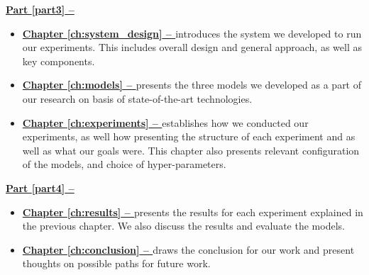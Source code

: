 \vspace{0.5cm}\noindent
\begin{minipage}{\linewidth}
    \textbf{{\hyperref[part3]{Part \ref{part3} -- }}}
    \begin{itemize}
        \item\textbf{\hyperref[ch:system_design]{Chapter \ref{ch:system_design} -- }} introduces the system we developed to run our experiments. This includes overall design and general approach, as well as key components.
        \item\textbf{\hyperref[ch:models]{Chapter \ref{ch:models} -- }} presents the three models we developed as a part of our research on basis of state-of-the-art technologies.
        \item\textbf{\hyperref[ch:experiments]{Chapter \ref{ch:experiments} -- }} establishes how we conducted our experiments, as well how presenting the structure of each experiment and as well as what our goals were. This chapter also presents relevant configuration of the models, and choice of hyper-parameters.
    \end{itemize}
\end{minipage}

\vspace{0.5cm}\noindent
\begin{minipage}{\linewidth}
    \textbf{{\hyperref[part4]{Part \ref{part4} -- }}}
    \begin{itemize}
        \item\textbf{\hyperref[ch:results]{Chapter \ref{ch:results} -- }} presents the results for each experiment explained in the previous chapter. We also discuss the results and evaluate the models.
        \item\textbf{\hyperref[ch:conclusion]{Chapter \ref{ch:conclusion} -- }} draws the conclusion for our work and present thoughts on possible paths for future work.
    \end{itemize}
\end{minipage}